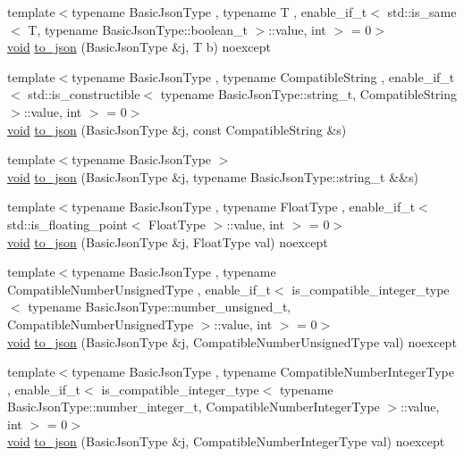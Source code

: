 \begin{DoxyCompactItemize}
\item 
{\footnotesize template$<$typename Basic\+Json\+Type , typename T , enable\+\_\+if\+\_\+t$<$ std\+::is\+\_\+same$<$ T, typename Basic\+Json\+Type\+::boolean\+\_\+t $>$\+::value, int $>$  = 0$>$ }\\\hyperlink{namespacenlohmann_1_1detail_a59fca69799f6b9e366710cb9043aa77d}{void} \hyperlink{namespacenlohmann_1_1detail_a1a804b98cbe89b7e44b698f2ca860490}{to\+\_\+json} (Basic\+Json\+Type \&j, T b) noexcept
\item 
{\footnotesize template$<$typename Basic\+Json\+Type , typename Compatible\+String , enable\+\_\+if\+\_\+t$<$ std\+::is\+\_\+constructible$<$ typename Basic\+Json\+Type\+::string\+\_\+t, Compatible\+String $>$\+::value, int $>$  = 0$>$ }\\\hyperlink{namespacenlohmann_1_1detail_a59fca69799f6b9e366710cb9043aa77d}{void} \hyperlink{namespacenlohmann_1_1detail_a7356ed05cdbbb080cee80e1211e1c6c9}{to\+\_\+json} (Basic\+Json\+Type \&j, const Compatible\+String \&s)
\item 
{\footnotesize template$<$typename Basic\+Json\+Type $>$ }\\\hyperlink{namespacenlohmann_1_1detail_a59fca69799f6b9e366710cb9043aa77d}{void} \hyperlink{namespacenlohmann_1_1detail_a4aa1ca6b7c61bf19d1f30ea5b669f68e}{to\+\_\+json} (Basic\+Json\+Type \&j, typename Basic\+Json\+Type\+::string\+\_\+t \&\&s)
\item 
{\footnotesize template$<$typename Basic\+Json\+Type , typename Float\+Type , enable\+\_\+if\+\_\+t$<$ std\+::is\+\_\+floating\+\_\+point$<$ Float\+Type $>$\+::value, int $>$  = 0$>$ }\\\hyperlink{namespacenlohmann_1_1detail_a59fca69799f6b9e366710cb9043aa77d}{void} \hyperlink{namespacenlohmann_1_1detail_a22bffdc8bc7e43af380ba2050696b230}{to\+\_\+json} (Basic\+Json\+Type \&j, Float\+Type val) noexcept
\item 
{\footnotesize template$<$typename Basic\+Json\+Type , typename Compatible\+Number\+Unsigned\+Type , enable\+\_\+if\+\_\+t$<$ is\+\_\+compatible\+\_\+integer\+\_\+type$<$ typename Basic\+Json\+Type\+::number\+\_\+unsigned\+\_\+t, Compatible\+Number\+Unsigned\+Type $>$\+::value, int $>$  = 0$>$ }\\\hyperlink{namespacenlohmann_1_1detail_a59fca69799f6b9e366710cb9043aa77d}{void} \hyperlink{namespacenlohmann_1_1detail_ae5fd66b5517b3b5a6c6b9fd9f29ba8dc}{to\+\_\+json} (Basic\+Json\+Type \&j, Compatible\+Number\+Unsigned\+Type val) noexcept
\item 
{\footnotesize template$<$typename Basic\+Json\+Type , typename Compatible\+Number\+Integer\+Type , enable\+\_\+if\+\_\+t$<$ is\+\_\+compatible\+\_\+integer\+\_\+type$<$ typename Basic\+Json\+Type\+::number\+\_\+integer\+\_\+t, Compatible\+Number\+Integer\+Type $>$\+::value, int $>$  = 0$>$ }\\\hyperlink{namespacenlohmann_1_1detail_a59fca69799f6b9e366710cb9043aa77d}{void} \hyperlink{namespacenlohmann_1_1detail_a91fe576be579c8c2fdd14610605c6dd2}{to\+\_\+json} (Basic\+Json\+Type \&j, Compatible\+Number\+Integer\+Type val) noexcept

\end{DoxyCompactItemize}
